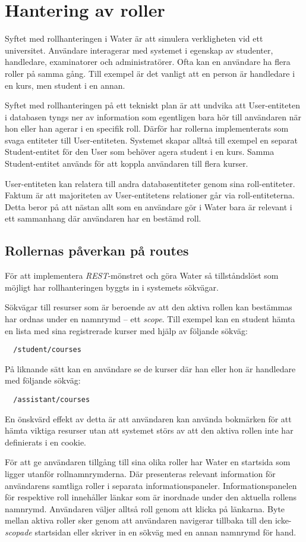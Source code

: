 \section{Hantering av roller}

Syftet med rollhanteringen i Water är att simulera verkligheten vid ett universitet. Användare interagerar med systemet i egenskap av studenter, handledare, examinatorer och administratörer. Ofta kan en användare ha flera roller på samma gång. Till exempel är det vanligt att en person är handledare i en kurs, men student i en annan. 

Syftet med rollhanteringen på ett tekniskt plan är att undvika att User-entiteten i databasen tyngs ner av information som egentligen bara hör till användaren när hon eller han agerar i en specifik roll. Därför har rollerna implementerats som svaga entiteter till User-entiteten. Systemet skapar alltså till exempel en separat Student-entitet för den User som behöver agera student i en kurs. Samma Student-entitet används för att koppla användaren till flera kurser.

User-entiteten kan relatera till andra databasentiteter genom sina roll-entiteter. 
Faktum är att majoriteten av User-entitetens relationer går via roll-entiteterna. Detta beror på att nästan allt som en användare gör i Water bara är relevant i ett sammanhang där användaren har en bestämd roll.

\subsection{Rollernas påverkan på routes}
För att implementera \emph{REST}-mönstret och göra Water så tillståndslöst som möjligt har rollhanteringen byggts in i systemets sökvägar.

Sökvägar till resurser som är beroende av att den aktiva rollen kan bestämmas har ordnas under en namnrymd – ett \emph{scope}.
Till exempel kan en student hämta en lista med sina registrerade kurser med hjälp av följande sökväg:

\begin{BVerbatim}
  /student/courses
\end{BVerbatim}

På liknande sätt kan en användare se de kurser där han eller hon är handledare med följande sökväg:

\begin{BVerbatim}
  /assistant/courses
\end{BVerbatim}

En önskvärd effekt av detta är att användaren kan använda bokmärken för att hämta viktiga resurser utan att systemet störs av att den aktiva rollen inte har definierats i en cookie.

För att ge användaren tillgång till sina olika roller har Water en startsida som ligger utanför rollnamnrymderna. Där presenteras relevant information för användarens samtliga roller i separata informationspaneler. 
Informationspanelen för respektive roll innehåller länkar som är inordnade under den aktuella rollens namnrymd. Användaren väljer alltså roll genom att klicka på länkarna. Byte mellan aktiva roller sker genom att användaren navigerar tillbaka till den icke-\emph{scopade} startsidan eller skriver in en sökväg med en annan namnrymd för hand.
